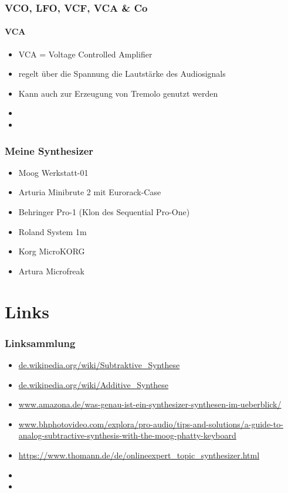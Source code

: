 \documentclass[11pt,ngerman]{beamer}
\begin{document}
\begin{frame}
\frametitle{VCO, LFO, VCF, VCA \& Co}
\framesubtitle{VCA}

\begin{itemize}
\item VCA = Voltage Controlled Amplifier 
\item regelt über die Spannung die Lautstärke des Audiosignals
\item Kann auch zur Erzeugung von Tremolo genutzt werden 
\item 
\item 
\end{itemize}
\end{frame}



\begin{frame}
\frametitle{Meine Synthesizer}


\begin{itemize}
\item Moog Werkstatt-01
\item Arturia Minibrute 2 mit Eurorack-Case
\item Behringer Pro-1 (Klon des Sequential Pro-One)
\item Roland System 1m
\item Korg MicroKORG
\item Artura Microfreak
\end{itemize}
\end{frame}

 
\section{Links} 
 
\begin{frame}[allowframebreaks]
\frametitle{Linksammlung}

{\scriptsize
\begin{itemize}
\item \url{de.wikipedia.org/wiki/Subtraktive_Synthese}
\item \url{de.wikipedia.org/wiki/Additive_Synthese}
\item \url{www.amazona.de/was-genau-ist-ein-synthesizer-synthesen-im-ueberblick/}
\item \url{www.bhphotovideo.com/explora/pro-audio/tips-and-solutions/a-guide-to-analog-subtractive-synthesis-with-the-moog-phatty-keyboard}
\item \url{https://www.thomann.de/de/onlineexpert_topic_synthesizer.html}
\item 
\item 
\end{itemize}}
\end{frame} 
 
 
 
\end{document}
